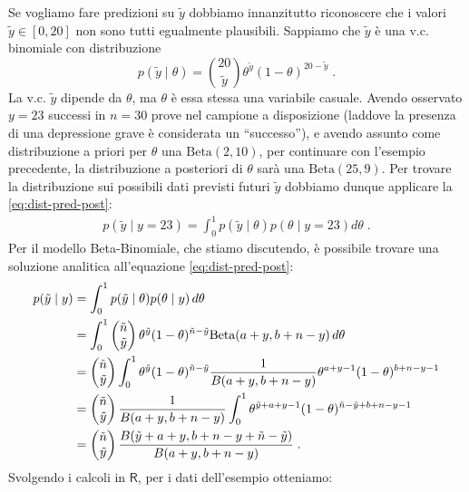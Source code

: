 \documentclass[
  10pt,
  italian,
  a4paper,
  extrafontsizes,onecolumn,openright
  ]{memoir}
\newcommand{\R}{\textsf{R}} %
\begin{document}
Se vogliamo fare predizioni su \(\tilde{y}\) dobbiamo innanzitutto riconoscere che i valori \(\tilde{y} \in [0, 20]\) non sono tutti egualmente plausibili. Sappiamo che \(\tilde{y}\) è una v.c. binomiale con distribuzione
\begin{equation}
p(\tilde{y}\mid \theta) = \binom{20}{\tilde{y}} \theta^{\tilde{y}}(1-\theta)^{20 - \tilde{y}} \; .
\label{eq:post-yprime}
\end{equation}
La v.c. \(\tilde{y}\) dipende da \(\theta\), ma \(\theta\) è essa stessa una variabile casuale. Avendo osservato \(y = 23\) successi in \(n = 30\) prove nel campione a disposizione (laddove la presenza di una depressione grave è considerata un ``successo''), e avendo assunto come distribuzione a priori per \(\theta\) una \(\mbox{Beta}(2, 10)\), per continuare con l'esempio precedente, la distribuzione a posteriori di \(\theta\) sarà una \(\mbox{Beta}(25, 9)\). Per trovare la distribuzione sui possibili dati previsti futuri \(\tilde{y}\) dobbiamo dunque applicare la \eqref{eq:dist-pred-post}:
\begin{align}
p(\tilde{y} \mid y = 23) = \int_0^1 p(\tilde{y} \mid \theta) p(\theta \mid y = 23) d\theta \; .
\label{eq:post-yprime-y17}
\end{align}
Per il modello Beta-Binomiale, che stiamo discutendo, è possibile trovare una soluzione analitica all'equazione \eqref{eq:dist-pred-post}:
\begin{align}
p(\tilde{y} \mid y) &= \int_0^1 p(\tilde{y} \mid \theta)
p(\theta \mid y)\, d\theta \notag\\
 &= \int_0^1 \begin{pmatrix}\tilde{n}\\\tilde{y}\end{pmatrix}
 \theta^{\tilde{y}}
(1-\theta)^{\tilde{n}-\tilde{y}} \mbox{Beta}(a+y,b+n-y) \, d\theta \notag\\
&= \begin{pmatrix}{\tilde{n}}\\\tilde{y}\end{pmatrix} \int_0^1 \theta^{\tilde{y}}
(1-\theta)^{\tilde{n}-\tilde{y}} \frac{1}{B(a+y, b+n-y)}\theta^{a+y-1}(1-\theta)^{b+n-y-1}\notag\\
&= \begin{pmatrix}{\tilde{n}}\\\tilde{y}\end{pmatrix} \frac{1}{B(a+y, b+n-y)}\int_0^1 \theta^{\tilde{y}+a+y-1}(1-\theta)^{\tilde{n}-\tilde{y}+b+n-y-1}\notag\\
&= \begin{pmatrix}{\tilde{n}}\\\tilde{y}\end{pmatrix} \frac{B(\tilde{y}+a+y,b+n-y+\tilde{n}-\tilde{y})}{B(a+y, b+n-y)} \; .
\label{eq:post-yprime-an-sol-betabin}
\end{align}
Svolgendo i calcoli in \(\R\), per i dati dell'esempio otteniamo:
\end{document}
